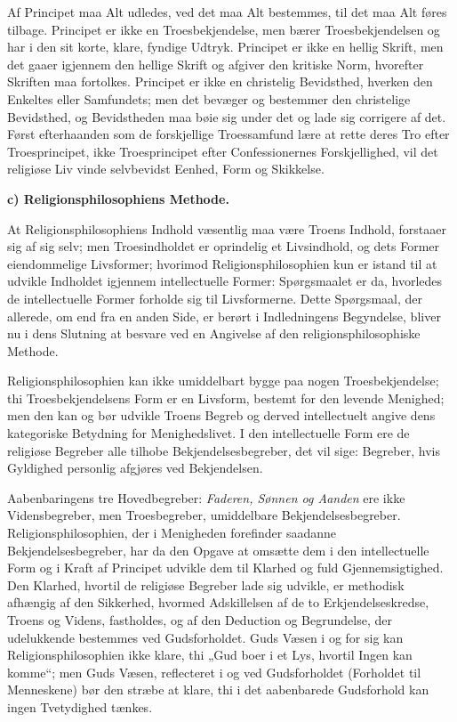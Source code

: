 \documentclass[12pt]{book}
\newcommand{\runhead}[1]{%
  \medskip\begin{center}{\bfseries #1}\end{center}\medskip}
\begin{document}
Af Principet maa Alt udledes, ved det maa Alt bestemmes, til det maa
Alt føres tilbage. Principet er ikke en Troesbekjendelse, men bærer
Troesbekjendelsen og har i den sit korte, klare, fyndige Udtryk.
Principet er ikke en hellig Skrift, men det gaaer igjennem den
hellige Skrift og afgiver den kritiske Norm, hvorefter Skriften maa
fortolkes. Principet er ikke en christelig Bevidsthed, hverken den
Enkeltes eller Samfundets; men det bevæger og bestemmer den
christelige Bevidsthed, og Bevidstheden maa bøie sig under det og
lade sig corrigere af det. Først efterhaanden som de forskjellige
Troessamfund lære at rette deres Tro efter Troesprincipet, ikke
Troesprincipet efter Confessionernes Forskjellighed, vil det
religiøse Liv vinde selvbevidst Eenhed, Form og Skikkelse.

\runhead{c) Religionsphilosophiens Methode.}

At Religionsphilosophiens Indhold væsentlig maa være Troens Indhold,
forstaaer sig af sig selv; men Troesindholdet er oprindelig et
Livsindhold, og dets Former eiendommelige Livsformer; hvorimod
Religionsphilosophien kun er istand til at udvikle Indholdet
igjennem intellectuelle Former: Spørgsmaalet er da, hvorledes de
intellectuelle Former forholde sig til Livsformerne. Dette
Spørgsmaal, der allerede, om end fra en anden Side, er berørt i
Indledningens Begyndelse, bliver nu i dens Slutning at
besvare ved en Angivelse af den religionsphilosophiske Methode.

Religionsphilosophien kan ikke umiddelbart bygge paa nogen
Troesbekjendelse; thi Troesbekjendelsens Form er en Livsform,
bestemt for den levende Menighed; men den kan og bør udvikle Troens
Begreb og derved intellectuelt angive dens kategoriske Betydning for
Menighedslivet. I den intellectuelle Form ere de religiøse Begreber
alle tilhobe Bekjendelsesbegreber, det vil sige: Begreber, hvis
Gyldighed personlig afgjøres ved Bekjendelsen.

Aabenbaringens tre Hovedbegreber: \emph{Faderen, Sønnen og Aanden}
ere ikke Vidensbegreber, men Troesbegreber, umiddelbare
Bekjendelsesbegreber. Religionsphilosophien, der i Menigheden
forefinder saadanne Bekjendelsesbegreber, har da den Opgave at
omsætte dem i den intellectuelle Form og i Kraft af Principet
udvikle dem til Klarhed og fuld Gjennemsigtighed. Den Klarhed,
hvortil de religiøse Begreber lade sig udvikle, er methodisk
afhængig af den Sikkerhed, hvormed Adskillelsen af de to
Erkjendelseskredse, Troens og Videns, fastholdes, og af den
Deduction og Begrundelse, der udelukkende bestemmes ved
Gudsforholdet. Guds Væsen i og for sig kan Religionsphilosophien
ikke klare, thi „Gud boer i et Lys, hvortil Ingen kan komme“; men
Guds Væsen, reflecteret i og ved Gudsforholdet (Forholdet til
Menneskene) bør den stræbe at klare, thi i det aabenbarede
Gudsforhold kan ingen Tvetydighed tænkes.
\end{document}
